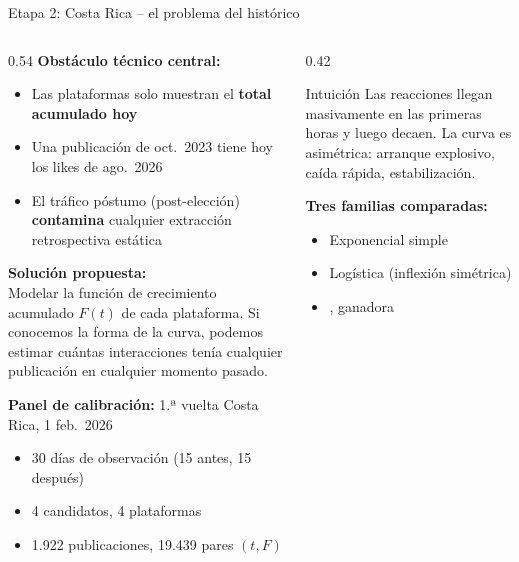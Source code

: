 \begin{frame}{Etapa 2: Costa Rica -- el problema del histórico}
  \begin{columns}[T]
    \begin{column}{0.54\textwidth}
      \textbf{Obstáculo técnico central:}
      \begin{itemize}
        \item Las plataformas solo muestran el \textbf{total acumulado hoy}
        \item Una publicación de oct.\ 2023 tiene hoy los likes de ago.\ 2026
        \item El tráfico póstumo (post-elección) \textbf{contamina} cualquier
              extracción retrospectiva estática
      \end{itemize}
      \vspace{0.3em}
      \textbf{Solución propuesta:}\\
      Modelar la función de crecimiento acumulado $F(t)$ de cada plataforma.
      Si conocemos la forma de la curva, podemos estimar cuántas interacciones
      tenía cualquier publicación en cualquier momento pasado.

      \vspace{0.3em}
      \textbf{Panel de calibración:} 1.ª vuelta Costa Rica, 1 feb.\ 2026
      \begin{itemize}
        \item 30 días de observación (15 antes, 15 después)
        \item 4 candidatos, 4 plataformas
        \item \num{1.922} publicaciones, \num{19.439} pares $(t, F)$
      \end{itemize}
    \end{column}
    \begin{column}{0.42\textwidth}
      \begin{block}{Intuición}
        Las reacciones llegan masivamente en las primeras horas y luego decaen.
        La curva es asimétrica: arranque explosivo, caída rápida, estabilización.
      \end{block}
      \vspace{0.5em}
      \textbf{Tres familias comparadas:}
      \begin{itemize}
        \item Exponencial simple
        \item Logística (inflexión simétrica)
        \item {}, ganadora
      \end{itemize}
    \end{column}
  \end{columns}
\end{frame}

